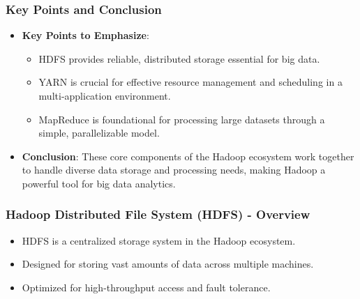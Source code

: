 \documentclass[aspectratio=169]{beamer}
\begin{document}
\begin{frame}[fragile]
    \frametitle{Key Points and Conclusion}
    \begin{itemize}
        \item \textbf{Key Points to Emphasize}:
        \begin{itemize}
            \item HDFS provides reliable, distributed storage essential for big data.
            \item YARN is crucial for effective resource management and scheduling in a multi-application environment.
            \item MapReduce is foundational for processing large datasets through a simple, parallelizable model.
        \end{itemize}
        \item \textbf{Conclusion}: These core components of the Hadoop ecosystem work together to handle diverse data storage and processing needs, making Hadoop a powerful tool for big data analytics.
    \end{itemize}
\end{frame}

\begin{frame}[fragile]
    \frametitle{Hadoop Distributed File System (HDFS) - Overview}
    \begin{itemize}
        \item HDFS is a centralized storage system in the Hadoop ecosystem.
        \item Designed for storing vast amounts of data across multiple machines.
        \item Optimized for high-throughput access and fault tolerance.
    \end{itemize}
\end{frame}
\end{document}
